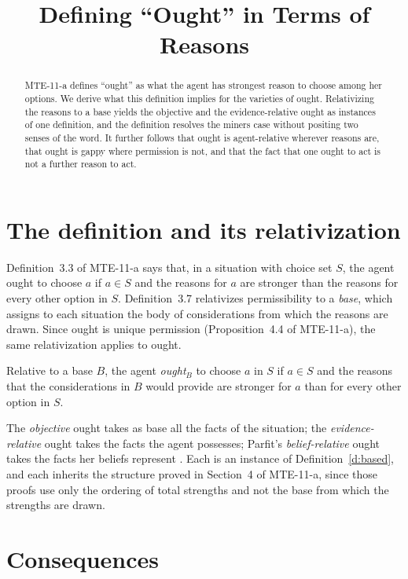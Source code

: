 \documentclass{situationist-preprint}
\title{Defining \enquote{Ought} in Terms of Reasons}
\begin{document}
\maketitle

\begin{abstract}
MTE-11-a defines \enquote{ought} as what the agent has strongest reason to choose among her options. We derive what this definition implies for the varieties of ought. Relativizing the reasons to a base yields the objective and the evidence-relative ought as instances of one definition, and the definition resolves the miners case without positing two senses of the word. It further follows that ought is agent-relative wherever reasons are, that ought is gappy where permission is not, and that the fact that one ought to act is not a further reason to act.
\end{abstract}

\section{The definition and its relativization}

Definition~3.3 of MTE-11-a says that, in a situation with choice set $S$, the agent ought to choose $a$ if $a\in S$ and the reasons for $a$ are stronger than the reasons for every other option in $S$. Definition~3.7 relativizes permissibility to a \emph{base}, which assigns to each situation the body of considerations from which the reasons are drawn. Since ought is unique permission (Proposition~4.4 of MTE-11-a), the same relativization applies to ought.

\begin{definition}\label{d:based}
Relative to a base $B$, the agent \emph{ought$_B$} to choose $a$ in $S$ if $a\in S$ and the reasons that the considerations in $B$ would provide are stronger for $a$ than for every other option in $S$.
\end{definition}

The \emph{objective} ought takes as base all the facts of the situation; the \emph{evidence-relative} ought takes the facts the agent possesses; Parfit's \emph{belief-relative} ought takes the facts her beliefs represent \citep{Parfit2011}. Each is an instance of Definition~\ref{d:based}, and each inherits the structure proved in Section~4 of MTE-11-a, since those proofs use only the ordering of total strengths and not the base from which the strengths are drawn.

\section{Consequences}
\end{document}

